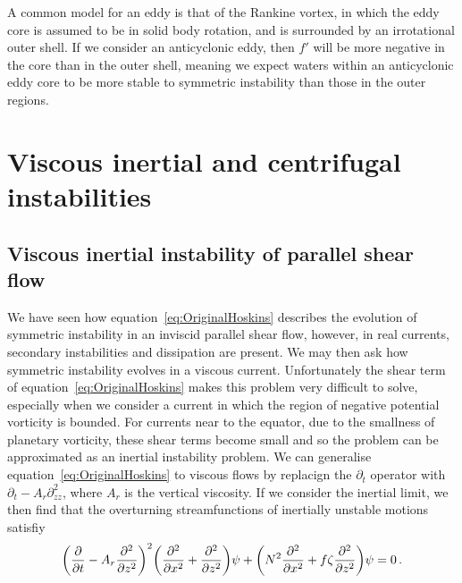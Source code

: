 A common model for an eddy is that of the Rankine vortex, in which the eddy core is assumed to be in solid body rotation, and is surrounded by an irrotational outer shell. If we consider an anticyclonic eddy, then $f'$ will be more negative in the core than in the outer shell, meaning we expect waters within an anticyclonic eddy core to be more stable to symmetric instability than those in the outer regions.





\section{Viscous inertial and centrifugal instabilities}
\subsection{Viscous inertial instability of parallel shear flow}
We have seen how equation~\ref{eq:OriginalHoskins} describes the evolution of symmetric instability in an inviscid parallel shear flow, however, in real currents, secondary instabilities and dissipation are present. We may then ask how symmetric instability evolves in a viscous current. Unfortunately the shear term of equation~\ref{eq:OriginalHoskins} makes this problem very difficult to solve, especially when we consider a current in which the region of negative potential vorticity is bounded. For currents near to the equator, due to the smallness of planetary vorticity, these shear terms become small and so the problem can be approximated as an inertial instability problem. We can generalise equation~\ref{eq:OriginalHoskins} to viscous flows by replacign the $\partial_t$ operator with $\partial_t - A_r \partial^2_{zz}$, where $A_r$ is the vertical viscosity. If we consider the inertial limit, we then find that the overturning streamfunctions of inertially unstable motions satisfiy
\begin{equation}
    \label{eq:BarotropicHoskins}
    \bigg(\pdv{}{t} - A_r \pdv[2]{}{z} \bigg)^2 \bigg(\pdv[2]{}{x} + \pdv[2]{}{z}\bigg) \psi + \bigg( N^2 \pdv[2]{}{x} + f \zeta \pdv[2]{}{z} \bigg) \psi = 0 \, .
\end{equation}

